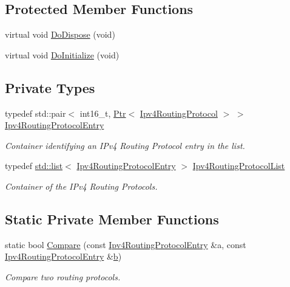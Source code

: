 \subsection*{Protected Member Functions}
\begin{DoxyCompactItemize}
\item 
virtual void \hyperlink{classns3_1_1Ipv4ListRouting_ae94b990042bc6b6b18a97b9cad762f5a}{Do\+Dispose} (void)
\item 
virtual void \hyperlink{classns3_1_1Ipv4ListRouting_a35a6c7058832ee73186638a14212329b}{Do\+Initialize} (void)
\end{DoxyCompactItemize}
\subsection*{Private Types}
\begin{DoxyCompactItemize}
\item 
typedef std\+::pair$<$ int16\+\_\+t, \hyperlink{classns3_1_1Ptr}{Ptr}$<$ \hyperlink{classns3_1_1Ipv4RoutingProtocol}{Ipv4\+Routing\+Protocol} $>$ $>$ \hyperlink{classns3_1_1Ipv4ListRouting_a0feb801e63daeed57304a27637e66011}{Ipv4\+Routing\+Protocol\+Entry}
\begin{DoxyCompactList}\small\item\em Container identifying an I\+Pv4 Routing Protocol entry in the list. \end{DoxyCompactList}\item 
typedef \hyperlink{openflow-interface_8h_afd9bcfa176617760671b67580f536fa7}{std\+::list}$<$ \hyperlink{classns3_1_1Ipv4ListRouting_a0feb801e63daeed57304a27637e66011}{Ipv4\+Routing\+Protocol\+Entry} $>$ \hyperlink{classns3_1_1Ipv4ListRouting_a895846238dc31be02086e45f9296f8dc}{Ipv4\+Routing\+Protocol\+List}
\begin{DoxyCompactList}\small\item\em Container of the I\+Pv4 Routing Protocols. \end{DoxyCompactList}\end{DoxyCompactItemize}
\subsection*{Static Private Member Functions}
\begin{DoxyCompactItemize}
\item 
static bool \hyperlink{classns3_1_1Ipv4ListRouting_abe747bab1e19417c9d5c4a73d3bad2bb}{Compare} (const \hyperlink{classns3_1_1Ipv4ListRouting_a0feb801e63daeed57304a27637e66011}{Ipv4\+Routing\+Protocol\+Entry} \&a, const \hyperlink{classns3_1_1Ipv4ListRouting_a0feb801e63daeed57304a27637e66011}{Ipv4\+Routing\+Protocol\+Entry} \&\hyperlink{lte__pathloss_8m_a21ad0bd836b90d08f4cf640b4c298e7c}{b})
\begin{DoxyCompactList}\small\item\em Compare two routing protocols. \end{DoxyCompactList}\end{DoxyCompactItemize}

